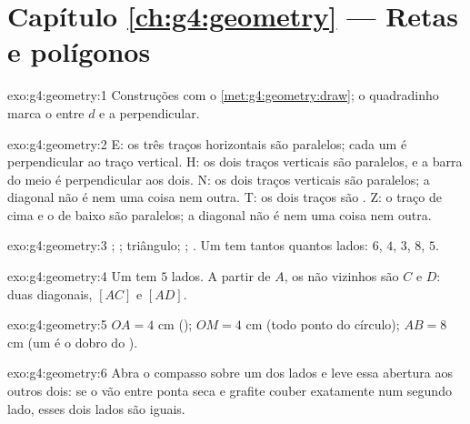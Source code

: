 \section*{Capítulo \ref{ch:g4:geometry} --- Retas e polígonos}

\begin{solution}{exo:g4:geometry:1}
Construções com o \cref{met:g4:geometry:draw}; o quadradinho marca o
 entre $d$ e a perpendicular.
\end{solution}

\begin{solution}{exo:g4:geometry:2}
E: os três traços horizontais são paralelos; cada um é perpendicular
ao traço vertical. H: os dois traços verticais são paralelos, e a
barra do meio é perpendicular aos dois. N: os dois traços verticais
são paralelos; a diagonal não é nem uma coisa nem outra. T: os dois
traços são . Z: o traço de cima e o de baixo são
paralelos; a diagonal não é nem uma coisa nem outra.
\end{solution}

\begin{solution}{exo:g4:geometry:3}
; ; triângulo; ; . Um 
tem tantos  quantos lados: $6$, $4$, $3$, $8$, $5$.
\end{solution}

\begin{solution}{exo:g4:geometry:4}
Um  tem $5$ lados. A partir de $A$, os  não vizinhos
são $C$ e $D$: duas diagonais, $[AC]$ e $[AD]$.
\end{solution}

\begin{solution}{exo:g4:geometry:5}
$OA = 4$ cm (); $OM = 4$ cm (todo ponto do círculo);
$AB = 8$ cm (um  é o dobro do ).
\end{solution}

\begin{solution}{exo:g4:geometry:6}
Abra o compasso sobre um dos lados e leve essa abertura aos outros
dois: se o vão entre ponta seca e grafite couber exatamente num
segundo lado, esses dois lados são iguais.
\end{solution}


